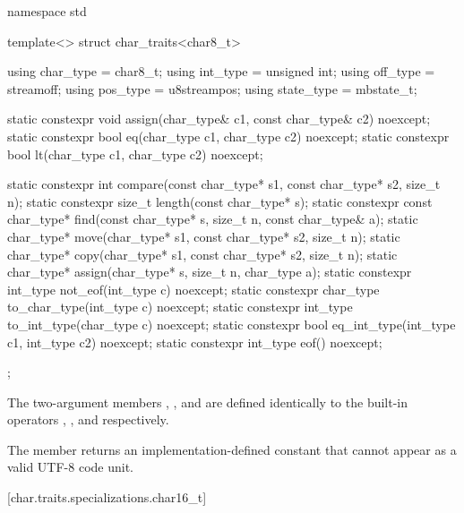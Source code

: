 %
\begin{codeblock}
namespace std {
  template<> struct char_traits<char8_t> {
    using char_type = char8_t;
    using int_type = unsigned int;
    using off_type = streamoff;
    using pos_type = u8streampos;
    using state_type = mbstate_t;

    static constexpr void assign(char_type& c1, const char_type& c2) noexcept;
    static constexpr bool eq(char_type c1, char_type c2) noexcept;
    static constexpr bool lt(char_type c1, char_type c2) noexcept;

    static constexpr int compare(const char_type* s1, const char_type* s2, size_t n);
    static constexpr size_t length(const char_type* s);
    static constexpr const char_type* find(const char_type* s, size_t n,
                                           const char_type& a);
    static char_type* move(char_type* s1, const char_type* s2, size_t n);
    static char_type* copy(char_type* s1, const char_type* s2, size_t n);
    static char_type* assign(char_type* s, size_t n, char_type a);
    static constexpr int_type not_eof(int_type c) noexcept;
    static constexpr char_type to_char_type(int_type c) noexcept;
    static constexpr int_type to_int_type(char_type c) noexcept;
    static constexpr bool eq_int_type(int_type c1, int_type c2) noexcept;
    static constexpr int_type eof() noexcept;
  };
}
\end{codeblock}

\pnum
The two-argument members , , and 
are defined identically to
the built-in operators \tcode{=}, \tcode{==}, and \tcode{<} respectively.

\pnum
The member  returns an implementation-defined constant
that cannot appear as a valid UTF-8 code unit.

[char.traits.specializations.char16_t]{}

